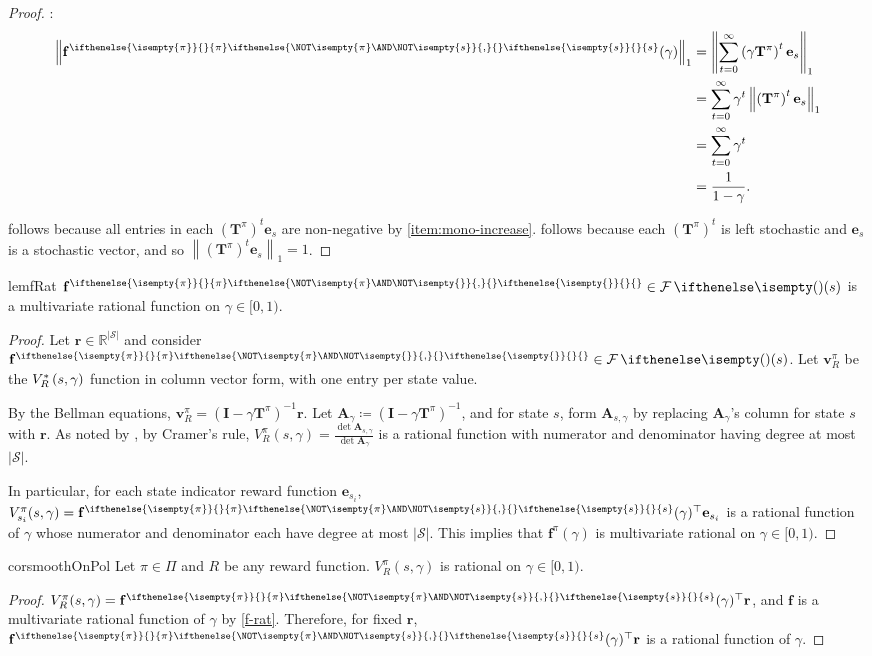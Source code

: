 \documentclass{article}
\renewcommand{\abs}[1]{\left|#1\right|}
\newcommand*{\prn}[1]{\left(#1\right)}
\newcommand*{\defeq}{\coloneqq} %
\newcommand*{\reals}{\mathbb{R}}
\newcommand*{\unitvec}[1][s]{\mathbf{e}_{#1}}
\newcommand*{\St}{\mathcal{S}}
\newcommand*{\rf}{\mathbf{r}} %
\newcommand*{\rewardVS}{\reals^{\abs{\St}}} %
\newcommand*{\f}{\mathbf{f}} %
\newcommand*{\fpi}[2][\pi]{\f^{
\ifthenelse{\isempty{#1}}{}{#1} %
\ifthenelse{\NOT\isempty{#1} \AND \NOT\isempty{#2}}{,}{} %
\ifthenelse{\isempty{#2}}{}{#2}}} %
\newcommand*{\lone}[1]{\left \lVert#1\right \rVert_1}
\newcommand*{\geom}[1][1]{\frac{#1}{1-\gamma}}
\newcommand*{\inv}{^{-1}}
\theoremstyle{definition}
\begin{document}
\begin{appendices}
\begin{proof}
:
\begin{align}
    \lone{\fpi{s}(\gamma)}&=\lone{\sum_{t=0}^\infty \prn{\gamma\mathbf{T}^\pi}^t\unitvec}\\
    &= \sum_{t=0}^\infty\gamma^t\lone{ \prn{\mathbf{T}^\pi}^t\unitvec}\label{eq:non-negative-norm}\\
    &= \sum_{t=0}^\infty \gamma^t\label{eq:left-stoch}\\
    &= \geom.
\end{align}

 follows because all entries in each $\prn{\mathbf{T}^\pi}^t\unitvec$ are non-negative by  \cref{item:mono-increase}.  follows because each $\prn{\mathbf{T}^\pi}^t$ is left stochastic and $\unitvec$ is a stochastic vector, and so $\lone{\prn{\mathbf{T}^\pi}^t\unitvec}=1$. 
\end{proof}

\begin{restatable}[$\f\in\F(s)$ is multivariate rational on $\gamma$]{lem}{fRat}\label{f-rat}
$\fpi{}\in\F(s)$ is a multivariate rational function on $\gamma\in[0,1)$.
\end{restatable}
\begin{proof}
Let $\rf\in\rewardVS$ and consider $\fpi{}\in\F(s)$. Let $\mathbf{v}^\pi_R$ be the $\OptVf{s,\gamma}$ function in column vector form, with one entry per state value.

By the Bellman equations, $\mathbf{v}^\pi_R = \prn{\mathbf{I}-\gamma\mathbf{T}^\pi}\inv\rf.$ Let $\mathbf{A}_\gamma \defeq \prn{\mathbf{I}-\gamma\mathbf{T}^\pi}\inv$, and for state $s$, form $ \mathbf{A}_{s,\gamma}$ by replacing  $\mathbf{A}_\gamma$'s column for state $s$ with $\rf$. As noted by \citet{lippman1968set}, by Cramer's rule, $V^\pi_R(s,\gamma)=\frac{\det{\mathbf{A}_{s,\gamma}}}{\det\mathbf{A}_\gamma}$ is a rational function with numerator and denominator having degree at most $\abs{\St}$.

In particular, for each state indicator reward function $\unitvec[s_i]$, $V^\pi_{s_i}(s,\gamma)=\fpi{s}(\gamma)^\top\unitvec[s_i]$ is a rational function of $\gamma$ whose numerator and denominator each have degree at most $\abs{\St}$. This implies that $\f^\pi(\gamma)$ is multivariate rational on $\gamma\in[0,1)$.
\end{proof}

\begin{restatable}{cor}{smoothOnPol}\label{smoothOnPol}
Let $\pi\in\Pi$ and $R$ be any reward function. $V^\pi_R(s,\gamma)$ is rational on  $\gamma\in[0,1)$. 
\end{restatable}
\begin{proof}
$V^\pi_R(s,\gamma)=\fpi{s}(\gamma)^\top \rf$, and $\f$ is a multivariate rational function of $\gamma$ by \cref{f-rat}. Therefore, for fixed $\rf$, $\fpi{s}(\gamma)^\top \rf$ is a rational function of $\gamma$.
\end{proof}


\end{appendices}
\end{document}
